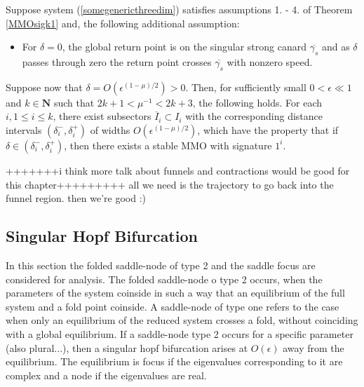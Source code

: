 \begin{theorem}
Suppose system (\ref{somegenericthreedim}) satisfies assumptions 1. - 4. of Theorem \ref{MMOsigk1} and, the following additional assumption:
\begin{itemize}
\item For $\delta = 0$, the global return point is on the singular strong canard $\overline{\gamma_s}$ and as $\delta$ passes through zero the return point crosses $\overline{\gamma_s}$ with nonzero speed.
\end{itemize}
Suppose now that $\delta= O(\epsilon ^{(1-\mu)/2})>0$. Then, for sufficiently small $0 < \epsilon \ll 1$ and $k \in \mathbf{N}$ such that $2k+1 < \mu^{-1} < 2k+ 3$, the following holds.
For each $i, 1 \leq i \leq k$, there exist subsectors $\overline{I}_i \subset I_i$ with the corresponding distance intervals $(\delta_i^-, \delta_i^+)$ of widths $O(\epsilon^{(1-\mu)/2})$, which have the property that if $\delta \in (\delta_i^-, \delta_i^+)$, then there exists a stable MMO with signature $1^i$.
\end{theorem}

+++++++i think more talk about funnels and contractions would be good for this chapter+++++++++
all we need is the trajectory to go back into the funnel region. then we're good :)


















































\subsection{Singular Hopf Bifurcation}
In this section the folded saddle-node of type 2 and the saddle focus are considered for analysis.
The folded saddle-node o type 2 occurs, when the parameters of the system coinside in such a way that an equilibrium of the full system and a fold point coinside. A saddle-node of type one refers to the case when only an equilibrium of the reduced system crosses a fold, without coinciding with a global equilibrium.
If a saddle-node type 2 occurs for a specific parameter (also plural...), then a singular hopf bifurcation arises at $O(\epsilon)$ away from the equilibrium.
The equilibrium is focus if the eigenvalues corresponding to it are complex and a node if the eigenvalues are real.

